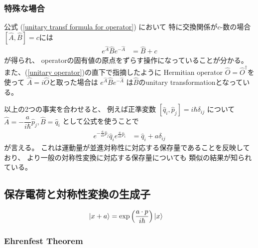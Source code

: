 \subsubsection{特殊な場合}

公式
(\ref{unitary transf formula for operator})
において
特に交換関係が$c$-数の場合$[\hat{A}, \hat{B}] = c$には
\begin{align}
    e^{ \hat{A} } \hat{B} e^{ - \hat{A} }
    &=
    \hat{B} + c
\label{finite translation of operator}
\end{align}
が得られ、
operatorの固有値の原点をずらす操作になっていることが分かる。
また、(\ref{unitary operator})の直下で指摘したように
Hermitian operator $\hat{O} = \hat{O}^\dagger$を使って
$\hat{A} = i \hat{O}$と取った場合は
$ e^{ \hat{A} } \hat{B} e^{ - \hat{A} } $
は$\hat{B}$のunitary transformationとなっている。

以上の2つの事実を合わせると、
例えば正準変数
$[\hat{q}_i, \hat{p}_j] = i\hbar\delta_{ij}$
について$\hat{A} = - \dfrac{a}{i\hbar} \hat{p}_j,
\hat{B} = \hat{q}_i$
として公式を使うことで
\begin{align}
    e^{ - \frac{a}{i\hbar} \hat{p}_j }
        \hat{q}_i
    e^{ \frac{a}{i\hbar} \hat{p}_i }
    &=
    \hat{q}_i + a \delta_{ij}
\end{align}
が言える。
これは運動量が並進対称性に対応する保存量であることを反映しており、
より一般の対称性変換に対応する保存量についても
類似の結果が知られている。

\newpage
\subsection{保存電荷と対称性変換の生成子}

\begin{align}
    \ket{ x + a }
    &=
    \exp\left(
        \dfrac{ a \cdot p }
        { i\hbar }
    \right)
    \ket{ x }
\end{align}

\subsubsection{Ehrenfest Theorem}

